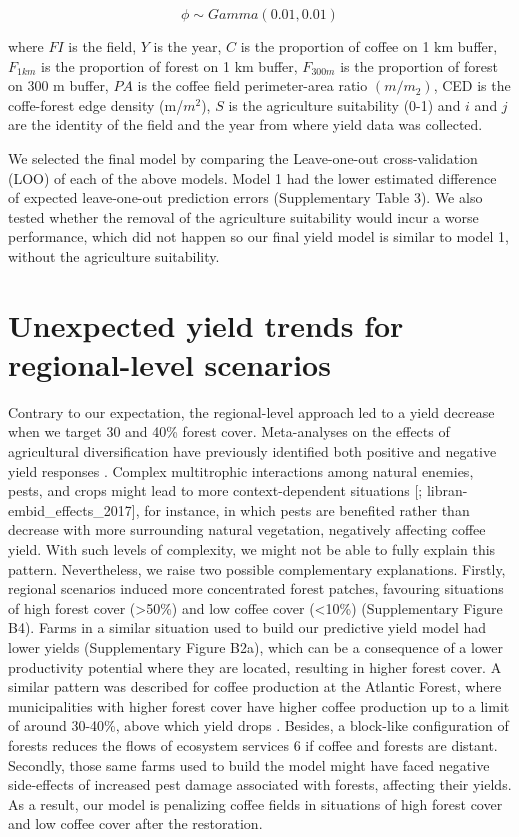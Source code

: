 \documentclass[
	12pt,				%
	oneside,			%
	a4paper,			%
	chapter=TITLE,		%
	section=TITLE,		%
	brazil,			%
	english				%
	]{abntex2}
\begin{document}
\[ \phi \sim Gamma (0.01,0.01) \]

where \(FI\) is the field, \(Y\) is the year, \(C\) is the proportion of coffee on 1 km buffer, \(F_{1km}\) is the proportion of forest on 1 km buffer, \(F_{300m}\) is the proportion of forest on 300 m buffer, \(PA\) is the coffee field perimeter-area ratio \((m/m_2)\), CED is the coffe-forest edge density (m/\(m^2\)), \(S\) is the agriculture suitability (0-1) and \(i\) and \(j\) are the identity of the field and the year from where yield data was collected.

We selected the final model by comparing the Leave-one-out cross-validation (LOO) of each of the above models. Model 1 had the lower estimated difference of expected leave-one-out prediction errors (Supplementary Table 3). We also tested whether the removal of the agriculture suitability would incur a worse performance, which did not happen so our final yield model is similar to model 1, without the agriculture suitability.

\hypertarget{unexpected-yield-trends-for-regional-level-scenarios}{%
\section{Unexpected yield trends for regional-level scenarios}\label{unexpected-yield-trends-for-regional-level-scenarios}}

Contrary to our expectation, the regional-level approach led to a yield decrease when we target 30 and 40\% forest cover. Meta-analyses on the effects of agricultural diversification have previously identified both positive and negative yield responses \autocite{tamburini_agricultural_2020,karp_crops_2018}. Complex multitrophic interactions among natural enemies, pests, and crops might lead to more context-dependent situations {[}\textcite{karp_crop_2018}; libran-embid\_effects\_2017{]}, for instance, in which pests are benefited rather than decrease with more surrounding natural vegetation, negatively affecting coffee yield. With such levels of complexity, we might not be able to fully explain this pattern. Nevertheless, we raise two possible complementary explanations. Firstly, regional scenarios induced more concentrated forest patches, favouring situations of high forest cover (\textgreater50\%) and low coffee cover (\textless10\%) (Supplementary Figure B4). Farms in a similar situation used to build our predictive yield model had lower yields (Supplementary Figure B2a), which can be a consequence of a lower productivity potential where they are located, resulting in higher forest cover. A similar pattern was described for coffee production at the Atlantic Forest, where municipalities with higher forest cover have higher coffee production up to a limit of around 30-40\%, above which yield drops \autocite{gonzalez-chaves_forest_2020}. Besides, a block-like configuration of forests reduces the flows of ecosystem services 6 if coffee and forests are distant. Secondly, those same farms used to build the model might have faced negative side-effects of increased pest damage associated with forests, affecting their yields. As a result, our model is penalizing coffee fields in situations of high forest cover and low coffee cover after the restoration.
\end{document}
